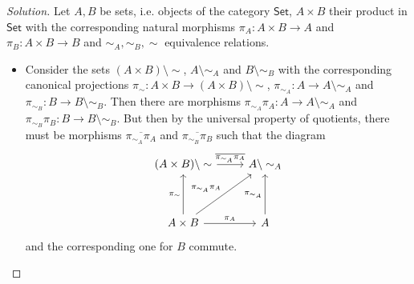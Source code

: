 \documentclass{article}
\theoremstyle{definition}
\newenvironment{solution}{
	\begin{proof}[Solution]
		\vspace{-8px}
		\setlength{\parskip}{4px}
		\setlength{\parindent}{0px}
	}{
\end{proof}
}
\newcommand{\Cset}{\mathsf{Set}}
\begin{document}
\begin{solution}
	Let $A, B$ be sets, i.e. objects of the category $\Cset$, $A \times B$ their product in $\Cset$ with the corresponding natural morphisms $\pi_A: A \times B \to A$ and $\pi_B: A \times B \to B$ and $\sim_A, \sim_B, \sim$ equivalence relations.
	\begin{itemize}
		\item Consider the sets $(A \times B) \setminus \sim$, $A \setminus \sim_A$ and $B \setminus \sim_B$ with the corresponding canonical projections $\pi_\sim: A \times B \to (A \times B) \setminus \sim$, $\pi_{\sim_A}: A \to A \setminus \sim_A$ and $\pi_{\sim_B}: B \to B \setminus \sim_B$. Then there are morphisms $\pi_{\sim_A} \pi_A: A \to A \setminus \sim_A$ and $\pi_{\sim_B} \pi_B: B \to B \setminus \sim_B$. But then by the universal property of quotients, there must be morphisms $\overline{\pi_{\sim_A} \pi_A}$ and $\overline{\pi_{\sim_B} \pi_B}$ such that the diagram
		\begin{equation*}
			\begin{tikzcd}[row sep=huge]
				{(A \times B) \setminus \sim} \arrow[r, "\overline{\pi_{\sim_A} \pi_A}"] & {A \setminus \sim_A} \\
				A \times B
					\arrow[u, "\pi_\sim"] 
					\arrow[ur, "\pi_{\sim_A} \pi_A" ]
					\arrow[r, "\pi_A"]
					& A \arrow[u, "\pi_{\sim_A}"] 
			\end{tikzcd}
		\end{equation*}
		and the corresponding one for $B$ commute.
		

\end{itemize}
\end{solution}
\end{document}
